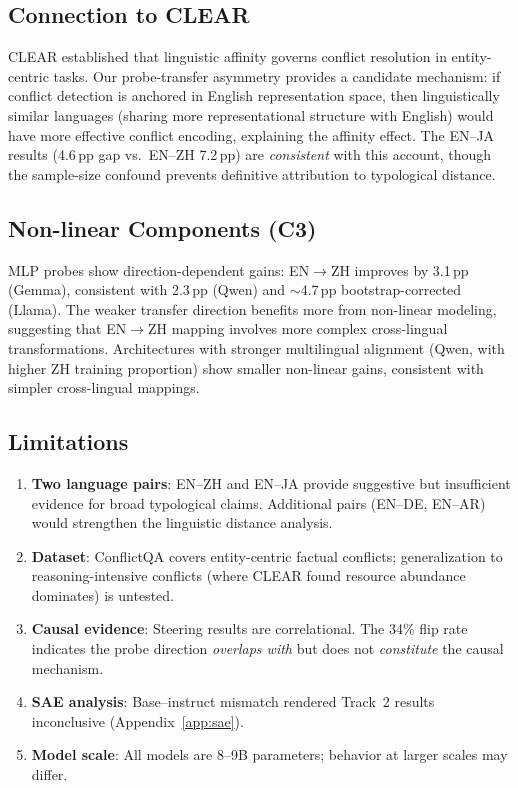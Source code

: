 \documentclass{article}
\begin{document}
\subsection{Connection to CLEAR}

CLEAR \citep{zhao2026clear} established that linguistic affinity governs conflict resolution in entity-centric tasks. Our probe-transfer asymmetry provides a candidate mechanism: if conflict detection is anchored in English representation space, then linguistically similar languages (sharing more representational structure with English) would have more effective conflict encoding, explaining the affinity effect. The EN--JA results (4.6\,pp gap vs.\ EN--ZH 7.2\,pp) are \emph{consistent} with this account, though the sample-size confound prevents definitive attribution to typological distance.

\subsection{Non-linear Components (C3)}

MLP probes show direction-dependent gains: EN$\to$ZH improves by 3.1\,pp (Gemma), consistent with 2.3\,pp (Qwen) and $\sim$4.7\,pp bootstrap-corrected (Llama). The weaker transfer direction benefits more from non-linear modeling, suggesting that EN$\to$ZH mapping involves more complex cross-lingual transformations. Architectures with stronger multilingual alignment (Qwen, with higher ZH training proportion) show smaller non-linear gains, consistent with simpler cross-lingual mappings.

\subsection{Limitations}

\begin{enumerate}
    \item \textbf{Two language pairs}: EN--ZH and EN--JA provide suggestive but insufficient evidence for broad typological claims. Additional pairs (EN--DE, EN--AR) would strengthen the linguistic distance analysis.
    \item \textbf{Dataset}: ConflictQA covers entity-centric factual conflicts; generalization to reasoning-intensive conflicts (where CLEAR found resource abundance dominates) is untested.
    \item \textbf{Causal evidence}: Steering results are correlational. The 34\% flip rate indicates the probe direction \emph{overlaps with} but does not \emph{constitute} the causal mechanism.
    \item \textbf{SAE analysis}: Base--instruct mismatch rendered Track~2 results inconclusive (Appendix~\ref{app:sae}).
    \item \textbf{Model scale}: All models are 8--9B parameters; behavior at larger scales may differ.
\end{enumerate}
\end{document}
